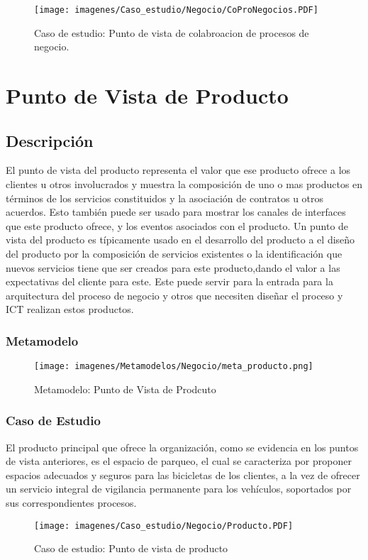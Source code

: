 \begin{figure}[h]
	\centering
	\texttt{[image: imagenes/Caso\_estudio/Negocio/CoProNegocios.PDF]}
	\caption{Caso de estudio: Punto de vista de colabroacion de procesos de negocio.}
	\label{fig:gap_analysis}
\end{figure}


\section{Punto de Vista de Producto}

\subsection{Descripción}
El punto de vista del producto representa el valor que ese producto ofrece a los clientes u otros involucrados y muestra la composición de uno o mas productos en términos de los servicios constituidos y la asociación de contratos u otros acuerdos. Esto también puede ser usado para mostrar los canales de interfaces que este producto ofrece, y los eventos asociados con el producto. Un punto de vista del producto es típicamente usado en el desarrollo del producto a el diseño del producto por la composición de servicios existentes o la identificación que nuevos servicios tiene que ser creados para este producto,dando el valor a las expectativas del cliente para este. Este puede servir para la entrada para la arquitectura del proceso de negocio y otros que necesiten diseñar el proceso y ICT realizan estos productos. 

\subsubsection{Metamodelo}
\begin{figure}[h]
	\centering
	\texttt{[image: imagenes/Metamodelos/Negocio/meta\_producto.png]}
	\caption{Metamodelo: Punto de Vista de Prodcuto}
	\label{fig:gap_analysis}
\end{figure}


\subsubsection{Caso de Estudio}
El producto principal que ofrece la organización, como se evidencia en los puntos de vista anteriores, es el espacio de parqueo, el cual se caracteriza por proponer espacios adecuados y seguros para las bicicletas de los clientes, a la vez de ofrecer un servicio integral de vigilancia permanente para los vehículos, soportados por sus correspondientes procesos.
\begin{figure}[h]
	\centering
	\texttt{[image: imagenes/Caso\_estudio/Negocio/Producto.PDF]}
	\caption{Caso de estudio: Punto de vista de producto}
	\label{fig:gap_analysis}
\end{figure}


